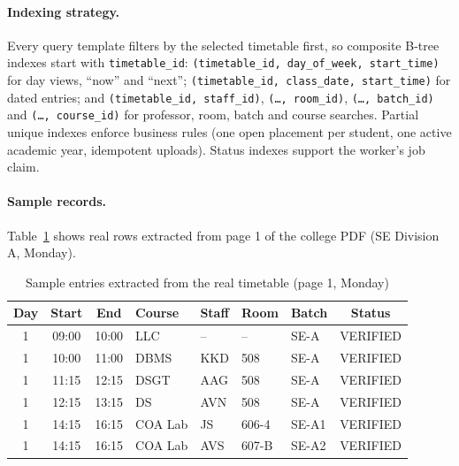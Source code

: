 \paragraph{Indexing strategy.}
Every query template filters by the selected timetable first, so composite B-tree indexes start with
\texttt{timetable\_id}:
\texttt{(timetable\_id, day\_of\_week, start\_time)} for day views, ``now'' and ``next''; \texttt{(timetable\_id,
class\_date, start\_time)} for dated entries; and \texttt{(timetable\_id, staff\_id)}, \texttt{(…, room\_id)},
\texttt{(…, batch\_id)} and \texttt{(…, course\_id)} for professor, room, batch and course searches.
Partial unique indexes enforce business rules (one open placement per student, one active
academic year, idempotent uploads). Status indexes support the worker's job claim.

\paragraph{Sample records.}
Table~\ref{tab:sample} shows real rows extracted from page 1 of the college PDF (SE Division A, Monday).

\begin{table}[H]
\centering
\caption{Sample entries extracted from the real timetable (page 1, Monday)}
\label{tab:sample}
\small
\begin{tabular}{@{}cccllllc@{}}
\toprule
\textbf{Day} & \textbf{Start} & \textbf{End} & \textbf{Course} & \textbf{Staff} & \textbf{Room} & \textbf{Batch} & \textbf{Status}\\
\midrule
1 & 09:00 & 10:00 & LLC & -- & -- & SE-A & VERIFIED\\
1 & 10:00 & 11:00 & DBMS & KKD & 508 & SE-A & VERIFIED\\
1 & 11:15 & 12:15 & DSGT & AAG & 508 & SE-A & VERIFIED\\
1 & 12:15 & 13:15 & DS & AVN & 508 & SE-A & VERIFIED\\
1 & 14:15 & 16:15 & COA Lab & JS & 606-4 & SE-A1 & VERIFIED\\
1 & 14:15 & 16:15 & COA Lab & AVS & 607-B & SE-A2 & VERIFIED\\
\bottomrule
\end{tabular}
\end{table}

